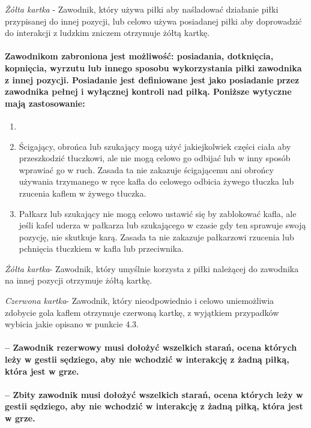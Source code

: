 \documentclass[12pt]{article}
\begin{document}
\emph{Żółta kartka} - Zawodnik, który używa piłki aby naśladować
działanie piłki przypisanej do innej pozycji, lub celowo używa
posiadanej piłki aby doprowadzić do interakcji z ludzkim zniczem
otrzymuje żółtą kartkę.

\paragraph{Zawodnikom zabroniona jest możliwość: posiadania,
dotknięcia, kopnięcia, wyrzutu lub innego sposobu wykorzystania piłki
zawodnika z innej pozycji. Posiadanie jest definiowane jest jako
posiadanie przez zawodnika pełnej i wyłącznej kontroli nad piłką.
Poniższe wytyczne mają zastosowanie:}

\begin{enumerate}
\item
    \item Ścigający, obrońca lub szukający mogą użyć jakiejkolwiek części
  ciała aby przeszkodzić tłuczkowi, ale nie mogą celowo go odbijać lub w
  inny sposób wprawiać go w ruch. Zasada ta nie zakazuje ścigającemu ani
  obrońcy używania trzymanego w ręce kafla do celowego odbicia żywego
  tłuczka lub rzucenia kaflem w żywego tłuczka.
  \item
    Pałkarz lub szukający nie mogą celowo ustawić się by zablokować kafla,
  ale jeśli kafel uderza w pałkarza lub szukającego w czasie gdy ten
  sprawuje swoją pozycję, nie skutkuje karą. Zasada ta nie zakazuje
  pałkarzowi rzucenia lub pchnięcia tłuczkiem w kafla lub przeciwnika.
  \end{enumerate}

\emph{Żółta kartka}- Zawodnik, który umyślnie korzysta z piłki należącej
do zawodnika na innej pozycji otrzymuje żółtą kartkę.

\emph{Czerwona kartka}- Zawodnik, który nieodpowiednio i celowo
uniemożliwia zdobycie gola kaflem otrzymuje czerwoną kartkę, z wyjątkiem
przypadków wybicia jakie opisano w punkcie 4.3.

\paragraph{-- Zawodnik rezerwowy musi dołożyć wszelkich starań,
ocena których leży w gestii sędziego, aby nie wchodzić w interakcję z
żadną piłką, która jest w grze.}

\paragraph{-- Zbity zawodnik musi dołożyć wszelkich starań, ocena
których leży w gestii sędziego, aby nie wchodzić w interakcję z żadną
piłką, która jest w grze.}
\end{document}
